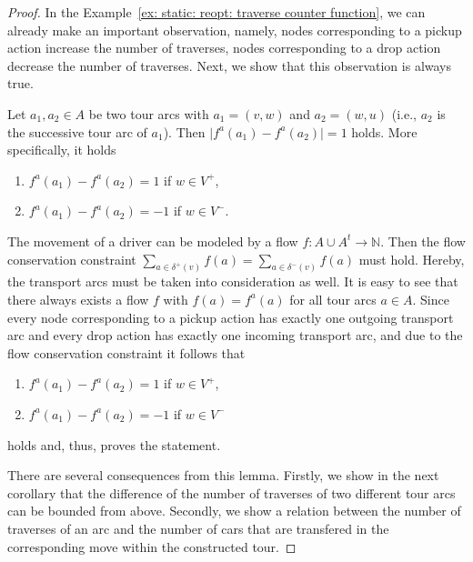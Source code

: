 \documentclass[english]{llncs}
\numberwithin{sublemma}{lemma}
\newcommand{\abs}[1]{\ensuremath{\lvert #1 \rvert}}
\newcommand{\NN}{\ensuremath{\mathbb{N}}}
\newcommand{\Vpick}{{V^+}}
\newcommand{\Vdrop}{{V^-}}
\begin{document}
\begin{proof}


In the Example~\ref{ex: static: reopt: traverse counter function}, we can already make an important observation,
namely, nodes corresponding to a pickup action increase the number of traverses, nodes corresponding to a drop action decrease the number of traverses.
Next, we show that this observation is always true.



\begin{sublemma}
\label{lem: static: reopt: abs diff 1}
Let $a_1, a_2 \in A$ be two tour arcs with $a_1 = (v, w)$ and $a_2 = (w, u)$ (i.e., $a_2$ is the successive tour arc of $a_1$).
Then $\abs{f^a(a_1) - f^a(a_2)} = 1$ holds.
More specifically, it holds
\begin{enumerate}
 \item \label{lem: static: reopt: abs diff 1: 1} $f^a(a_1) - f^a(a_2) = 1$ if $w \in \Vpick$,
 \item \label{lem: static: reopt: abs diff 1: 2} $f^a(a_1) - f^a(a_2) = -1$ if $w \in \Vdrop$.
\end{enumerate}
\end{sublemma}



\begin{subproof}
The movement of a driver can be modeled by a flow $f : A \cup A^t \to \NN$.
Then the flow conservation constraint $\sum_{a \in \delta^+(v)} f(a) = \sum_{a \in \delta^-(v)} f(a)$ must hold.
Hereby, the transport arcs must be taken into consideration as well.
It is easy to see that there always exists a flow $f$ with $f(a) = f^a(a)$ for all tour arcs $a \in A$.
Since every node corresponding to a pickup action has exactly one outgoing transport arc and every drop action has exactly one incoming transport arc,
and due to the flow conservation constraint it follows that
\begin{enumerate}
 \item $f^a(a_1) - f^a(a_2) = 1$ if $w \in \Vpick$,
 \item $f^a(a_1) - f^a(a_2) = -1$ if $w \in \Vdrop$
\end{enumerate}
holds and, thus, proves the statement.
\end{subproof}



There are several consequences from this lemma.
Firstly, we show in the next corollary that the difference of the number of traverses of two different tour arcs can be bounded from above.
Secondly, we show a relation between the number of traverses of an arc and the number of cars that are transfered in the corresponding move within the constructed tour.



\end{proof}
\end{document}
